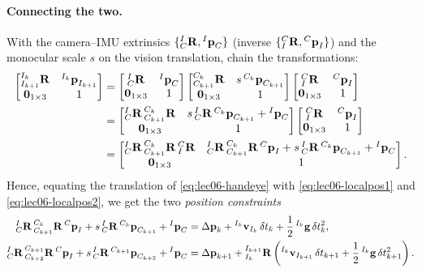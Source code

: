 \paragraph{Connecting the two.} With the camera--IMU extrinsics $\{{}^{I}_{C}\boldsymbol{\mathbf{R}}, {}^{I}\boldsymbol{\mathbf{p}}_C\}$ (inverse $\{{}^{C}_{I}\boldsymbol{\mathbf{R}}, {}^{C}\boldsymbol{\mathbf{p}}_I\}$) and the monocular scale $s$ on the vision translation, chain the transformations:
\begin{align}
\begin{bmatrix}
{}^{I_k}_{I_{k+1}}\boldsymbol{\mathbf{R}} & {}^{I_k}\boldsymbol{\mathbf{p}}_{I_{k+1}} \\
\boldsymbol{\mathbf{0}}_{1\times3} & 1
\end{bmatrix}
&=
\begin{bmatrix}
{}^{I}_{C}\boldsymbol{\mathbf{R}} & {}^{I}\boldsymbol{\mathbf{p}}_C \\
\boldsymbol{\mathbf{0}}_{1\times3} & 1
\end{bmatrix}
\begin{bmatrix}
{}^{C_k}_{C_{k+1}}\boldsymbol{\mathbf{R}} & s\,{}^{C_k}\boldsymbol{\mathbf{p}}_{C_{k+1}} \\
\boldsymbol{\mathbf{0}}_{1\times3} & 1
\end{bmatrix}
\begin{bmatrix}
{}^{C}_{I}\boldsymbol{\mathbf{R}} & {}^{C}\boldsymbol{\mathbf{p}}_I \\
\boldsymbol{\mathbf{0}}_{1\times3} & 1
\end{bmatrix} \\
&=
\begin{bmatrix}
{}^{I}_{C}\boldsymbol{\mathbf{R}}\,{}^{C_k}_{C_{k+1}}\boldsymbol{\mathbf{R}} & s\,{}^{I}_{C}\boldsymbol{\mathbf{R}}\,{}^{C_k}\boldsymbol{\mathbf{p}}_{C_{k+1}} + {}^{I}\boldsymbol{\mathbf{p}}_C \\
\boldsymbol{\mathbf{0}}_{1\times3} & 1
\end{bmatrix}
\begin{bmatrix}
{}^{C}_{I}\boldsymbol{\mathbf{R}} & {}^{C}\boldsymbol{\mathbf{p}}_I \\
\boldsymbol{\mathbf{0}}_{1\times3} & 1
\end{bmatrix} \\
&=
\begin{bmatrix}
{}^{I}_{C}\boldsymbol{\mathbf{R}}\,{}^{C_k}_{C_{k+1}}\boldsymbol{\mathbf{R}}\,{}^{C}_{I}\boldsymbol{\mathbf{R}} &
{}^{I}_{C}\boldsymbol{\mathbf{R}}\,{}^{C_k}_{C_{k+1}}\boldsymbol{\mathbf{R}}\,{}^{C}\boldsymbol{\mathbf{p}}_I + s\,{}^{I}_{C}\boldsymbol{\mathbf{R}}\,{}^{C_k}\boldsymbol{\mathbf{p}}_{C_{k+1}} + {}^{I}\boldsymbol{\mathbf{p}}_C \\
\boldsymbol{\mathbf{0}}_{1\times3} & 1
\end{bmatrix}.
\label{eq:lec06-handeye}
\end{align}
Hence, equating the translation of \eqref{eq:lec06-handeye} with \eqref{eq:lec06-localpos1} and \eqref{eq:lec06-localpos2}, we get the two \emph{position constraints}
\begin{align}
{}^{I}_{C}\boldsymbol{\mathbf{R}}\,{}^{C_k}_{C_{k+1}}\boldsymbol{\mathbf{R}}\,{}^{C}\boldsymbol{\mathbf{p}}_I + s\,{}^{I}_{C}\boldsymbol{\mathbf{R}}\,{}^{C_k}\boldsymbol{\mathbf{p}}_{C_{k+1}} + {}^{I}\boldsymbol{\mathbf{p}}_C
&= \Delta\boldsymbol{\mathbf{p}}_k + {}^{I_k}\boldsymbol{\mathbf{v}}_{I_k}\,\delta t_k + \frac{1}{2}\,{}^{I_k}\boldsymbol{\mathbf{g}}\,\delta t_k^2, \\
{}^{I}_{C}\boldsymbol{\mathbf{R}}\,{}^{C_{k+1}}_{C_{k+2}}\boldsymbol{\mathbf{R}}\,{}^{C}\boldsymbol{\mathbf{p}}_I + s\,{}^{I}_{C}\boldsymbol{\mathbf{R}}\,{}^{C_{k+1}}\boldsymbol{\mathbf{p}}_{C_{k+2}} + {}^{I}\boldsymbol{\mathbf{p}}_C
&= \Delta\boldsymbol{\mathbf{p}}_{k+1} + {}^{I_{k+1}}_{I_k}\boldsymbol{\mathbf{R}}\left({}^{I_k}\boldsymbol{\mathbf{v}}_{I_{k+1}}\,\delta t_{k+1} + \frac{1}{2}\,{}^{I_k}\boldsymbol{\mathbf{g}}\,\delta t_{k+1}^2\right).
\label{eq:lec06-posconstraints}
\end{align}
